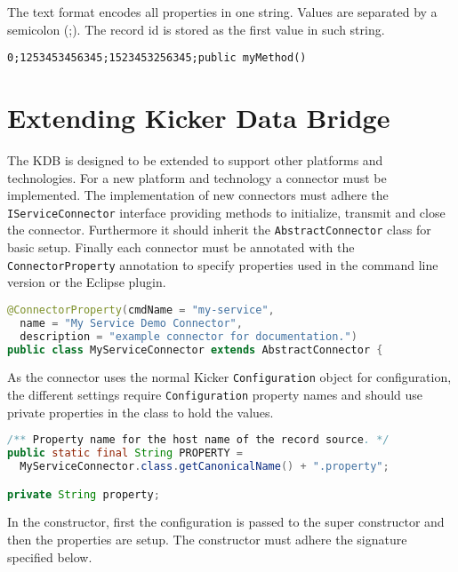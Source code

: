 \documentclass[11pt,a4paper]{article}
\begin{document}
The text format encodes all properties in one string. Values are separated by a semicolon (;). The record id is stored as the first value in such string.

\begin{verbatim}
0;1253453456345;1523453256345;public myMethod()
\end{verbatim}


\section{Extending Kicker Data Bridge}\label{s:extension}

The KDB is designed to be extended to support other platforms and technologies. For a new platform and technology a connector must be implemented. The implementation of new connectors must adhere the \texttt{IServiceConnector} interface providing methods to initialize, transmit and close the connector. Furthermore it should inherit the \texttt{AbstractConnector} class for basic setup. Finally each connector must be annotated with the \texttt{ConnectorProperty} annotation to specify properties used in the command line version or the Eclipse plugin.

\begin{lstlisting}[language=Java,caption=Example connector declaration]
@ConnectorProperty(cmdName = "my-service",
  name = "My Service Demo Connector",
  description = "example connector for documentation.")
public class MyServiceConnector extends AbstractConnector {
\end{lstlisting}

\noindent As the connector uses the normal Kicker \texttt{Configuration} object for configuration, the different settings require \texttt{Configuration} property names and should use private properties in the class to hold the values.

\begin{lstlisting}[language=Java,caption=Example constant for connector configuration and its accompanying property declaration]
/** Property name for the host name of the record source. */
public static final String PROPERTY =
  MyServiceConnector.class.getCanonicalName() + ".property";

private String property;
\end{lstlisting}

\noindent In the constructor, first the configuration is passed to the super constructor and then the properties are setup. The constructor must adhere the signature specified below.
\end{document}
